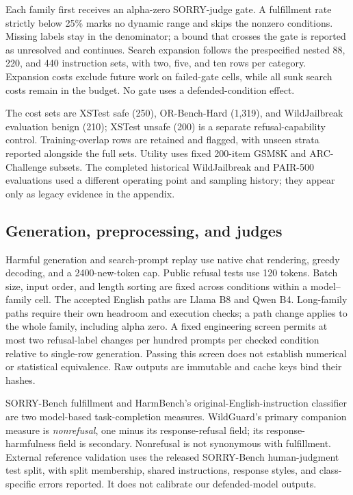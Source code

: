 Each family first receives an alpha-zero SORRY-judge gate. A fulfillment rate strictly below 25\% marks no dynamic range and skips the nonzero conditions. Missing labels stay in the denominator; a bound that crosses the gate is reported as unresolved and continues. Search expansion follows the prespecified nested 88, 220, and 440 instruction sets, with two, five, and ten rows per category. Expansion costs exclude future work on failed-gate cells, while all sunk search costs remain in the budget. No gate uses a defended-condition effect.

The cost sets are XSTest safe (250), OR-Bench-Hard (1,319), and WildJailbreak evaluation benign (210); XSTest unsafe (200) is a separate refusal-capability control. Training-overlap rows are retained and flagged, with unseen strata reported alongside the full sets. Utility uses fixed 200-item GSM8K and ARC-Challenge subsets. The completed historical WildJailbreak and PAIR-500 evaluations used a different operating point and sampling history; they appear only as legacy evidence in the appendix.

\subsection{Generation, preprocessing, and judges}
Harmful generation and search-prompt replay use native chat rendering, greedy decoding, and a 2400-new-token cap. Public refusal tests use 120 tokens. Batch size, input order, and length sorting are fixed across conditions within a model--family cell. The accepted English paths are Llama B8 and Qwen B4. Long-family paths require their own headroom and execution checks; a path change applies to the whole family, including alpha zero. A fixed engineering screen permits at most two refusal-label changes per hundred prompts per checked condition relative to single-row generation. Passing this screen does not establish numerical or statistical equivalence. Raw outputs are immutable and cache keys bind their hashes.

SORRY-Bench fulfillment and HarmBench's original-English-instruction classifier are two model-based task-completion measures. WildGuard's primary companion measure is \emph{nonrefusal}, one minus its response-refusal field; its response-harmfulness field is secondary. Nonrefusal is not synonymous with fulfillment. External reference validation uses the released SORRY-Bench human-judgment test split, with split membership, shared instructions, response styles, and class-specific errors reported. It does not calibrate our defended-model outputs.

